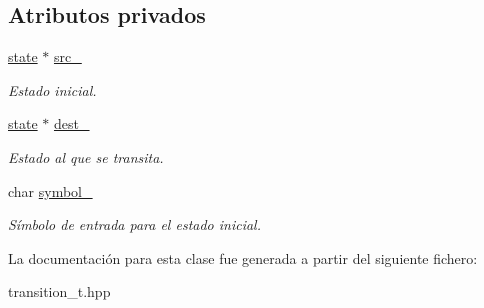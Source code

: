 \subsection*{Atributos privados}
\begin{DoxyCompactItemize}
\item 
\hypertarget{classtransition_a384e5fed746ff029cd1d1c70b4781a4f}{}\hyperlink{classstate}{state} $\ast$ \hyperlink{classtransition_a384e5fed746ff029cd1d1c70b4781a4f}{src\+\_\+}\label{classtransition_a384e5fed746ff029cd1d1c70b4781a4f}

\begin{DoxyCompactList}\small\item\em Estado inicial. \end{DoxyCompactList}\item 
\hypertarget{classtransition_ae5c54bd33ca2d6ec05c6ef3341e5e8b0}{}\hyperlink{classstate}{state} $\ast$ \hyperlink{classtransition_ae5c54bd33ca2d6ec05c6ef3341e5e8b0}{dest\+\_\+}\label{classtransition_ae5c54bd33ca2d6ec05c6ef3341e5e8b0}

\begin{DoxyCompactList}\small\item\em Estado al que se transita. \end{DoxyCompactList}\item 
\hypertarget{classtransition_aef941bfe7a270655abf97ea9bf2d0ce7}{}char \hyperlink{classtransition_aef941bfe7a270655abf97ea9bf2d0ce7}{symbol\+\_\+}\label{classtransition_aef941bfe7a270655abf97ea9bf2d0ce7}

\begin{DoxyCompactList}\small\item\em Símbolo de entrada para el estado inicial. \end{DoxyCompactList}\end{DoxyCompactItemize}


La documentación para esta clase fue generada a partir del siguiente fichero\+:\begin{DoxyCompactItemize}
\item 
transition\+\_\+t.\+hpp\end{DoxyCompactItemize}
